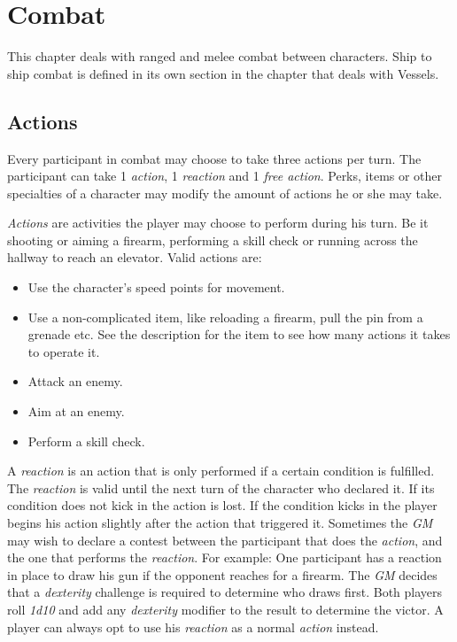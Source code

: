 \chapter{Combat}
\label{chap:Combat}

This chapter deals with ranged and melee combat between characters. Ship to ship
combat is defined in its own section in the chapter that deals with Vessels.

\section{Actions}
\label{sec:7-Actions}

Every participant in combat may choose to take three actions per turn. The
participant can take 1 \emph{action}, 1 \emph{reaction} and 1 \emph{free
  action}. Perks, items or other specialties of a character may modify the
amount of actions he or she may take.

\emph{Actions} are activities the player may choose to perform during his
turn. Be it shooting or aiming a firearm, performing a skill check or running
across the hallway to reach an elevator. Valid actions are:

\begin{itemize}
\item Use the character's speed points for movement.
\item Use a non-complicated item, like reloading a firearm, pull the pin from a
  grenade etc. See the description for the item to see how many actions it takes
  to operate it.
\item Attack an enemy.
\item Aim at an enemy.
\item Perform a skill check.
\end{itemize}

A \emph{reaction} is an action that is only performed if a certain condition
is fulfilled. The \emph{reaction} is valid until the next turn of the
character who declared it. If its condition does not kick in the action is
lost. If the condition kicks in the player begins his action slightly after
the action that triggered it. Sometimes the \emph{GM} may wish to declare a
contest between the participant that does the \emph{action}, and the one that
performs the \emph{reaction}. For example: One participant has a reaction in
place to draw his gun if the opponent reaches for a firearm. The \emph{GM}
decides that a \emph{dexterity} challenge is required to determine who
draws first. Both players roll \emph{1d10} and add any \emph{dexterity}
modifier to the result to determine the victor. A player can always opt to use
his \emph{reaction} as a normal \emph{action} instead.

